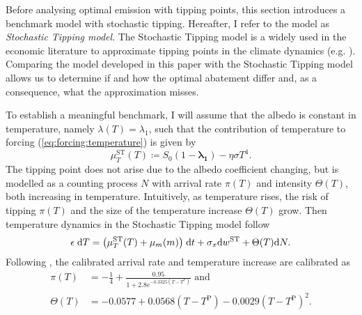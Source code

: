 \documentclass[../../main.tex]{subfiles}
\begin{document}
Before analysing optimal emission with tipping points, this section introduces a benchmark model with stochastic tipping. Hereafter, I refer to the model as \textit{Stochastic Tipping model}. The Stochastic Tipping model is a widely used in the economic literature to approximate tipping points in the climate dynamics (e.g. \citealt{hambel_optimal_2021}). Comparing the model developed in this paper with the Stochastic Tipping model allows us to determine if and how the optimal abatement differ and, as a consequence, what the approximation misses.

To establish a meaningful benchmark, I will assume that the albedo is constant in temperature, namely $\lambda(T) = \lambda_1$, such that the contribution of temperature to forcing (\ref{eq:forcing:temperature}) is given by \begin{equation}
    \mu^{\mathrm{ST}}_T(T) \coloneqq S_0 (1 - \mathbf{\lambda_1}) - \eta\sigma T^4.
\end{equation} The tipping point does not arise due to the albedo coefficient changing, but is modelled as a counting process $N$ with arrival rate $\pi(T)$ and intensity $\Theta(T)$, both increasing in temperature. Intuitively, as temperature rises, the risk of tipping $\pi(T)$ and the size of the temperature increase $\Theta(T)$ grow. Then temperature dynamics in the Stochastic Tipping model follow \begin{equation}
    \epsilon \; \mathrm{d}T = \big(\mu^{\mathrm{ST}}_T(T)  + \mu_m(m) \big) \; \mathrm{d}t + \sigma_x \mathrm{d}w^{\mathrm{ST}} + \Theta(T) \mathrm{d}N.
\end{equation} Following \cite{hambel_optimal_2021}, the calibrated arrival rate and temperature increase are calibrated as \begin{align}
    \pi(T) &=  -\frac{1}{4} + \frac{0.95}{1 + 2.8 e^{-0.3325 (T - T^{\mathrm{P}})}} \text{ and } \\
    \Theta(T) &= -0.0577 + 0.0568 (T - T^{\mathrm{P}})-0.0029(T - T^{\mathrm{P}})^2.
\end{align}
\end{document}
